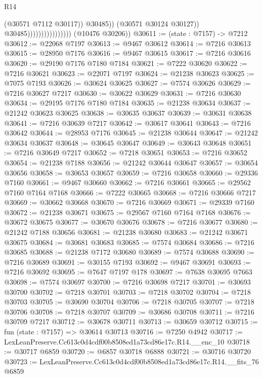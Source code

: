 \begin{lexlean}{R14}
\begin{coremodule}
                                              (@30571 @7112 @30117))
                                            @30485))
                                        (@30571 @30124 @30127))
                                      @30485))))))))))))))))
      (@10476 @30206))
@30611 := (state : @7157) -> @7212
@30612 := @22068 @7197
@30613 := @9467 @30612
@30614 := @7216 @30613
@30615 := @28950 @7176
@30616 := @9467 @30615
@30617 := @7216 @30616
@30620 := @29190 @7176 @7180 @7184
@30621 := @7222 @30620
@30622 := @7216 @30621
@30623 := @22071 @7197
@30624 := @21238 @30623
@30625 := @7075 @7193
@30626 := @30624 @30625
@30627 := @7574 @30626
@30629 := @7216 @30627 @7217
@30630 := @30622 @30629
@30631 := @7216 @30630
@30634 := @29195 @7176 @7180 @7184
@30635 := @21238 @30634
@30637 := @21242 @30623 @30625
@30638 := @30635 @30637
@30639 := @30631 @30638
@30641 := @7216 @30639 @7217
@30642 := @30617 @30641
@30643 := @7216 @30642
@30644 := @28953 @7176
@30645 := @21238 @30644
@30647 := @21242 @30634 @30637
@30648 := @30645 @30647
@30649 := @30643 @30648
@30651 := @7216 @30649 @7217
@30652 := @7218 @30651
@30653 := @7216 @30652
@30654 := @21238 @7188
@30656 := @21242 @30644 @30647
@30657 := @30654 @30656
@30658 := @30653 @30657
@30659 := @7216 @30658
@30660 := @29336 @7160
@30661 := @9467 @30660
@30662 := @7216 @30661
@30665 := @29562 @7160 @7164 @7168
@30666 := @7222 @30665
@30668 := @7216 @30666 @7217
@30669 := @30662 @30668
@30670 := @7216 @30669
@30671 := @29339 @7160
@30672 := @21238 @30671
@30675 := @29567 @7160 @7164 @7168
@30676 := @30672 @30675
@30677 := @30670 @30676
@30678 := @7216 @30677
@30680 := @21242 @7188 @30656
@30681 := @21238 @30680
@30683 := @21242 @30671 @30675
@30684 := @30681 @30683
@30685 := @7574 @30684
@30686 := @7216 @30685
@30688 := @21238 @7172 @30680
@30689 := @7574 @30688
@30690 := @7216 @30689
@30691 := @30155 @7193
@30692 := @9467 @30691
@30693 := @7216 @30692
@30695 := @7647 @7197 @178
@30697 := @7638 @30695 @7663
@30698 := @7574 @30697
@30700 := @7216 @30698 @7217
@30701 := @30693 @30700
@30702 := @7218 @30701
@30703 := @7218 @30702
@30704 := @7218 @30703
@30705 := @30690 @30704
@30706 := @7218 @30705
@30707 := @7218 @30706
@30708 := @7218 @30707
@30709 := @30686 @30708
@30711 := @7216 @30709 @7217
@30712 := @30678 @30711
@30713 := @30659 @30712
@30715 := fun (state : @7157) => @30614 @30713
@30716 := @7250 @4942
@30717 := LexLeanPreserve.Cc613c0d4cdf00b8508ed1a73cd86e17c.R14.__enc_10
@30718 := @30717 @6859
@30720 := @6857 @30718 @6888
@30721 := @30716 @30720
@30723 := LexLeanPreserve.Cc613c0d4cdf00b8508ed1a73cd86e17c.R14.__fits_76 @6859

\end{coremodule}
\end{lexlean}
